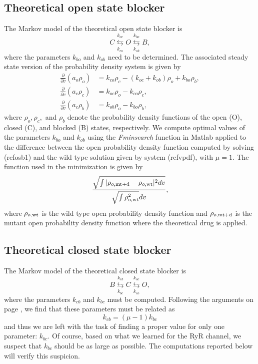 \bigskip

\subsection{Theoretical open state blocker}

The Markov model of the theoretical open state blocker is
\begin{equation}
C\underset{k_{co}}{\overset{k_{oc}}{\leftrightarrows}}O\underset{k_{ob}
}{\overset{k_{bo}}{\leftrightarrows}}B, \label{ob1}
\end{equation}
where the parameters $k_{bo}$ and $k_{ob}$ need to be determined. The
associated steady state version of the probability density system is given by
\begin{align}
\frac{\partial}{\partial v}\left(  a_{o}\rho_{o}\right)   &  =k_{co}\rho
_{c}-\left(  k_{oc}+k_{ob}\right)  \rho_{o}+k_{bo}\rho_{b},\nonumber\\
\frac{\partial}{\partial v}\left(  a_{c}\rho_{c}\right)   &  =k_{oc}\rho
_{o}-k_{co}\rho_{c},\label{osb1}\\
\frac{\partial}{\partial v}\left(  a_{c}\rho_{b}\right)   &  =k_{ob}\rho
_{o}-k_{bo}\rho_{b},\nonumber
\end{align}
where $\rho_{o},\rho_{c},$ and $\rho_{b}$ denote the probability density
functions of the open (O), closed (C), and blocked (B) states, respectively. We
compute optimal values of the parameters $k_{bo}$ and $k_{ob}$ using the
{\it Fminsearch} function in Matlab applied to the difference between the open
probability density function computed by solving (ref{osb1})
and the wild type solution given by system (ref{vpdf}),
with $\mu=1.$  The function used in the minimization is given by
\[ \frac{\sqrt{\int |\rho_{o,\rm{mt+d}}-\rho_{o,\rm{wt}}|^2 dv}}{ \sqrt{\int \rho^2_{o,\rm{wt}}}dv}, \]
where $\rho_{o,\rm{wt}}$ is the wild type open probability density function and $\rho_{o,\rm{mt+d}}$
is the mutant open probability density function where the theoretical drug is applied.

\subsection{Theoretical closed state blocker}


\bigskip The Markov model of the theoretical closed state blocker is
\begin{equation}
B\underset{k_{bc}}{\overset{k_{cb}}{\leftrightarrows}}C\underset{k_{co}
}{\overset{k_{oc}}{\leftrightarrows}}O, \label{vcb}
\end{equation}
where the parameters $k_{cb}$ and $k_{bc}$ must be computed. Following the
arguments on page \pageref{sec:eq-closed}, we find that these parameters must be
related as
\begin{equation}
k_{cb}=\left(  \mu-1\right)  k_{bc} \label{kcbv}
\end{equation}
and thus we are left with the task of finding a proper value for only one
parameter: $k_{bc}.$ Of course, based on what we learned for the RyR channel,
we suspect that $k_{bc}$ should be as large as possible. The computations 
reported below will verify this suspicion.

